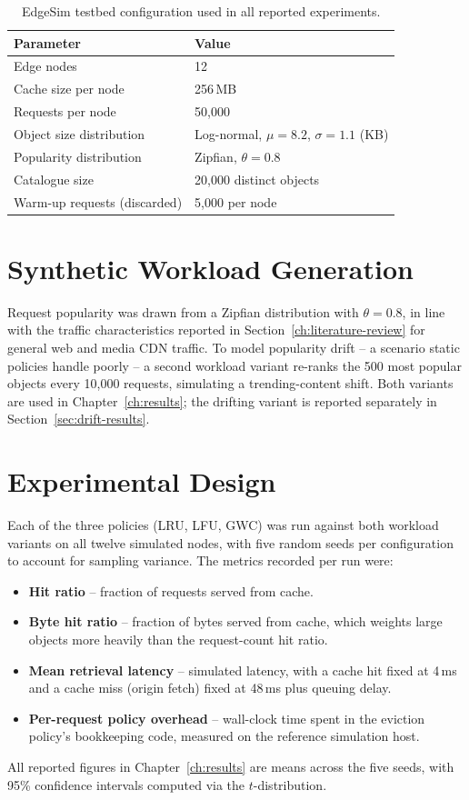 \begin{table}[h]
  \centering
  \caption{EdgeSim testbed configuration used in all reported experiments.}
  \label{tab:testbed-config}
  \begin{tabular}{@{}ll@{}}
    \toprule
    \textbf{Parameter} & \textbf{Value} \\
    \midrule
    Edge nodes                  & 12 \\
    Cache size per node         & 256\,MB \\
    Requests per node           & 50,000 \\
    Object size distribution    & Log-normal, $\mu=8.2$, $\sigma=1.1$ (KB) \\
    Popularity distribution     & Zipfian, $\theta = 0.8$ \\
    Catalogue size               & 20,000 distinct objects \\
    Warm-up requests (discarded) & 5,000 per node \\
    \bottomrule
  \end{tabular}
\end{table}

\section{Synthetic Workload Generation}
\label{sec:workload}
Request popularity was drawn from a Zipfian distribution with $\theta = 0.8$, in line with
the traffic characteristics reported in Section~\ref{ch:literature-review} for general web
and media CDN traffic. To model popularity drift -- a scenario static policies handle poorly
-- a second workload variant re-ranks the 500 most popular objects every 10,000 requests,
simulating a trending-content shift. Both variants are used in Chapter~\ref{ch:results};
the drifting variant is reported separately in Section~\ref{sec:drift-results}.

\section{Experimental Design}
\label{sec:experimental-design}
Each of the three policies (LRU, LFU, GWC) was run against both workload variants on all
twelve simulated nodes, with five random seeds per configuration to account for
sampling variance. The metrics recorded per run were:

\begin{itemize}
  \item \textbf{Hit ratio} -- fraction of requests served from cache.
  \item \textbf{Byte hit ratio} -- fraction of bytes served from cache, which weights large
        objects more heavily than the request-count hit ratio.
  \item \textbf{Mean retrieval latency} -- simulated latency, with a cache hit fixed at
        4\,ms and a cache miss (origin fetch) fixed at 48\,ms plus queuing delay.
  \item \textbf{Per-request policy overhead} -- wall-clock time spent in the eviction
        policy's bookkeeping code, measured on the reference simulation host.
\end{itemize}

All reported figures in Chapter~\ref{ch:results} are means across the five seeds, with 95\%
confidence intervals computed via the $t$-distribution.
